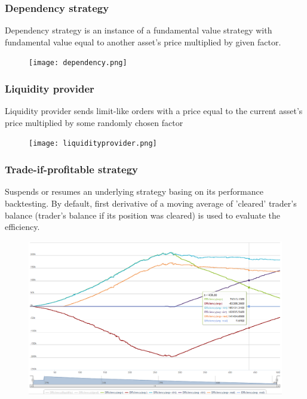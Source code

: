 \documentclass{beamer}
\begin{document}
\begin{frame}
\frametitle{Dependency strategy}
Dependency strategy is an instance of a fundamental value strategy with fundamental value equal to another asset's price multiplied by given factor.
\begin{figure}[htbp]
\centering
\texttt{[image: dependency.png]}
\end{figure}
\end{frame}

\begin{frame}
\frametitle{Liquidity provider}
Liquidity provider sends limit-like orders with a price equal to the current asset's price multiplied by some randomly chosen factor
\begin{figure}[htbp]
\centering
\texttt{[image: liquidityprovider.png]}
\end{figure}
\end{frame}

\begin{frame}
\frametitle{Trade-if-profitable strategy}
Suspends or resumes an underlying strategy basing on its performance backtesting. By default, first derivative of a moving average of 'cleared' trader's balance (trader's balance if its position was cleared) is used to evaluate the efficiency.
\begin{figure}[htbp]
\centering
\includegraphics[width=1\linewidth]{tradeifprofitable.png}
\end{figure}
\end{frame}
\end{document}
